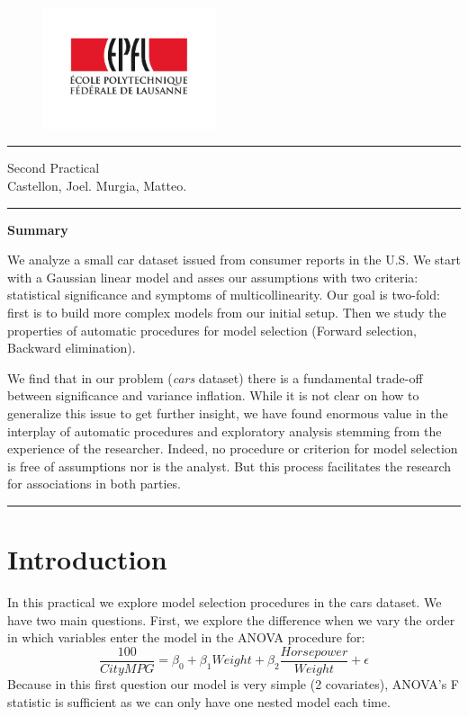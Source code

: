 \documentclass[12pt]{article}
\begin{document}
\thispagestyle{empty}
\begin{figure}[h!]
\centering
\includegraphics[width=2in]{epfl.pdf}
\vspace{1em}
\end{figure}
\hrule
\vspace{1em}
\begin{center}
{\Huge Second Practical} \\
\vspace{1.5em}
Castellon, Joel. Murgia, Matteo.
\end{center}
\vspace{1.5em}
\hrule

\vspace{1.5em}

\begin{center}
{\Large \bf Summary}
\end{center}
We analyze a small car dataset issued from consumer reports in the U.S. We start
with a Gaussian linear model and asses our assumptions with two criteria: statistical
significance and symptoms of multicollinearity.
Our goal is two-fold: first is to build more complex models from our initial setup. Then we 
study the properties of automatic procedures for model selection (Forward selection, Backward elimination).

We find that in our problem (\emph{cars} dataset) there is a fundamental trade-off between significance
and variance inflation. While it is not clear on how to generalize this issue to get further insight, we have
found enormous value in the interplay of automatic procedures and exploratory analysis stemming from
the experience of the researcher.
Indeed, no procedure or criterion for model selection is free of assumptions nor is the analyst.
But this process facilitates the research for associations in both parties.

\vspace{1em}

\tableofcontents

\vfill

\hrule

\newpage
\setcounter{page}{1}
\section{Introduction}
In this practical we explore model selection procedures in the cars dataset.
We have two main questions. First, we explore the difference when
we vary the order in which variables enter the model in the ANOVA procedure for:
\begin{equation}\label{eq:model}
\frac{100}{City MPG} = \beta_0 + \beta_1Weight + \beta_2\frac{Horsepower}{Weight} + \epsilon
\end{equation}
Because in this first question our model is very simple (2 covariates), ANOVA's
F statistic is sufficient as we can only have one nested model each time.
\end{document}
